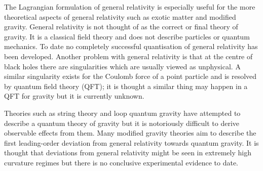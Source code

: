 The Lagrangian formulation of general relativity is especially useful for the more theoretical aspects of general relativity such as exotic matter and modified gravity. General relativity is not thought of as the correct or final theory of gravity. It is a classical field theory and does not describe particles or quantum mechanics. To date no \color{orchid} completely \color{black} successful quantisation of general relativity has been developed. Another problem with general relativity is that at the centre of black holes there are singularities which are usually viewed as unphysical. A similar singularity exists for the Coulomb force of a point particle and is resolved by quantum field theory (QFT); it is thought a similar thing may happen in a QFT for gravity but it is currently unknown.

Theories such as string theory and loop quantum gravity have attempted to describe a quantum theory of gravity but it is notoriously difficult to derive observable effects from them. Many modified gravity theories aim to describe the first leading-order deviation from general relativity towards quantum gravity. It is thought that deviations from general relativity might be seen in extremely high curvature regimes but there is no conclusive experimental evidence to date.





